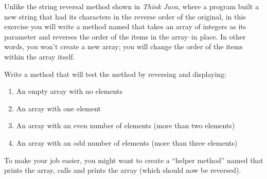 \begin{exercise}
\label{ex:stringReversal}

Unlike the string reversal method shown in {\em Think Java}, where a program built a new string that had its characters in the reverse order of the original, in this exercise you will write a  method named  that takes an array of integers as its parameter and reverses the order of the items in the array--in place. In other words, you won't create a new array; you will change the order of the items within the array itself.

Write a  method that will test the method by reversing and displaying:

\begin{enumerate}
\item An empty array with no elements
\item An array with one element
\item An array with an even number of elements (more than two elements)
\item An array with an odd number of elements (more than three elements)
\end{enumerate}

To make your job easier, you might want to create a ``helper method'' named  that prints the array, calls  and prints the array (which should now be reversed).
\end{exercise}

